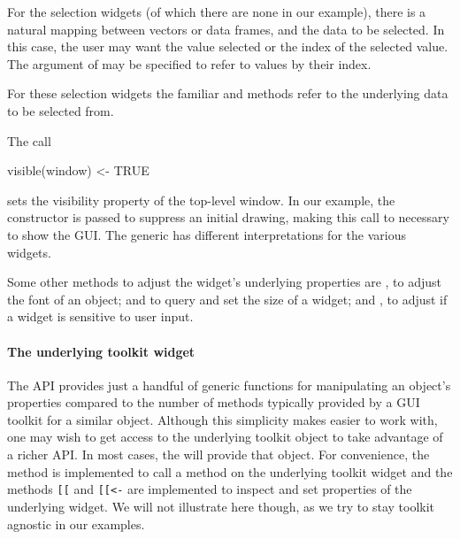 For the selection widgets (of which there are none in our example), there
is a natural mapping between vectors or data frames, and the data to
be selected. In this case, the user may want the value selected or the
index of the selected value. The  argument of
 may be specified to refer to values by their index. 

For these selection widgets the familiar \meth{[} and \meth{[\ASSIGN}
methods refer to the underlying data to be selected from.



The call
\begin{Schunk}
\begin{Sinput}
 visible(window) <- TRUE
\end{Sinput}
\end{Schunk}
%
sets the visibility property of the top-level window. In our example,
the  constructor is passed  to
suppress an initial drawing, making this call to
 necessary to show the GUI. The
 generic has different interpretations for the
various widgets.

Some other methods to adjust the widget's underlying properties are
, to adjust the font of an object;  and
 to query and set the size of a widget; and
, to adjust if a widget is sensitive to user
input.


\paragraph{The underlying toolkit widget}
The  API provides just a handful of generic functions
for manipulating an object's properties compared to the number of
methods typically provided by a GUI toolkit for a similar
object. Although this simplicity makes  easier to work
with, one may wish to get access to the underlying toolkit object to
take advantage of a richer API. In most cases, the
 will provide that object.  For convenience,
the method  is implemented to call a method on
the underlying toolkit widget and the methods \verb+[[+
and \verb+[[<-+ are implemented to inspect and set
properties of the underlying widget.  We will not illustrate here though,
as we try to stay toolkit agnostic in our examples.



